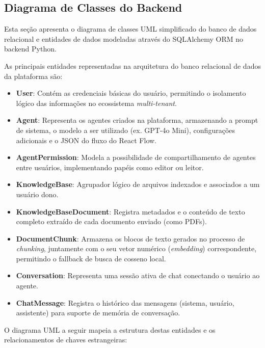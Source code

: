 \documentclass[12pt, openright, oneside, a4paper, brazil]{ads-unipac-abntex2}
\begin{document}
\begin{apendicesenv}
\partapendices

\chapter{Diagrama de Classes do Backend}
Esta seção apresenta o diagrama de classes UML simplificado do banco de dados relacional e entidades de dados modeladas através do SQLAlchemy ORM no backend Python.

As principais entidades representadas na arquitetura do banco relacional de dados da plataforma são:
\begin{itemize}
    \item \textbf{User}: Contém as credenciais básicas do usuário, permitindo o isolamento lógico das informações no ecossistema \textit{multi-tenant}.
    \item \textbf{Agent}: Representa os agentes criados na plataforma, armazenando a prompt de sistema, o modelo a ser utilizado (ex. GPT-4o Mini), configurações adicionais e o JSON do fluxo do React Flow.
    \item \textbf{AgentPermission}: Modela a possibilidade de compartilhamento de agentes entre usuários, implementando papéis como editor ou leitor.
    \item \textbf{KnowledgeBase}: Agrupador lógico de arquivos indexados e associados a um usuário dono.
    \item \textbf{KnowledgeBaseDocument}: Registra metadados e o conteúdo de texto completo extraído de cada documento enviado (como PDFs).
    \item \textbf{DocumentChunk}: Armazena os blocos de texto gerados no processo de \textit{chunking}, juntamente com o seu vetor numérico (\textit{embedding}) correspondente, permitindo o fallback de busca de cosseno local.
    \item \textbf{Conversation}: Representa uma sessão ativa de chat conectando o usuário ao agente.
    \item \textbf{ChatMessage}: Registra o histórico das mensagens (sistema, usuário, assistente) para suporte de memória de conversação.
\end{itemize}

O diagrama UML a seguir mapeia a estrutura destas entidades e os relacionamentos de chaves estrangeiras:


\end{apendicesenv}
\end{document}
